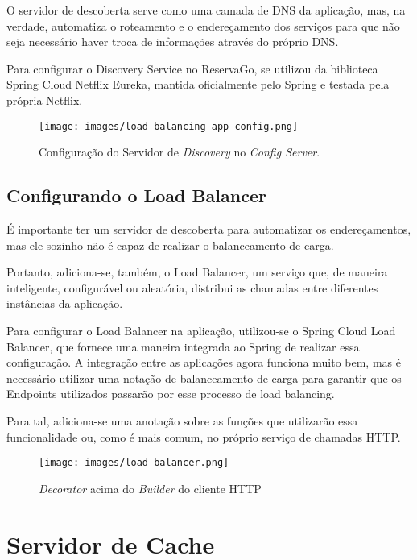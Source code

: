 \documentclass[12pt, openright, oneside, a4paper, article,
  section=TITLE
]{abntex2}
\begin{document}
O servidor de descoberta serve como uma camada de DNS da aplicação, mas, na verdade, automatiza o roteamento e o endereçamento dos serviços para que não seja necessário haver troca de informações através do próprio DNS. 

Para configurar o Discovery Service no ReservaGo, se utilizou da biblioteca Spring Cloud Netflix Eureka, mantida oficialmente pelo Spring e testada pela própria Netflix. 

\begin{figure}[htb]
  \begin{center}
    \texttt{[image: images/load-balancing-app-config.png]}
  \end{center}
  \caption{Configuração do Servidor de \textit{Discovery} no \textit{Config Server}.}
\end{figure}

\subsection{Configurando o Load Balancer}

É importante ter um servidor de descoberta para automatizar os endereçamentos, mas ele sozinho não é capaz de realizar o balanceamento de carga. 

Portanto, adiciona-se, também, o Load Balancer, um serviço que, de maneira inteligente, configurável ou aleatória, distribui as chamadas entre diferentes instâncias da aplicação. 

Para configurar o Load Balancer na aplicação, utilizou-se o Spring Cloud Load Balancer, que fornece uma maneira integrada ao Spring de realizar essa configuração. A integração entre as aplicações agora funciona muito bem, mas é necessário utilizar uma notação de balanceamento de carga para garantir que os Endpoints utilizados passarão por esse processo de load balancing. 

Para tal, adiciona-se uma anotação sobre as funções que utilizarão essa funcionalidade ou, como é mais comum, no próprio serviço de chamadas HTTP. 

\begin{figure}[htb]
  \begin{center}
    \texttt{[image: images/load-balancer.png]}
  \end{center}
  \caption{\textit{Decorator} acima do \textit{Builder} do cliente HTTP}
\end{figure}

\section{Servidor de Cache}
\end{document}
